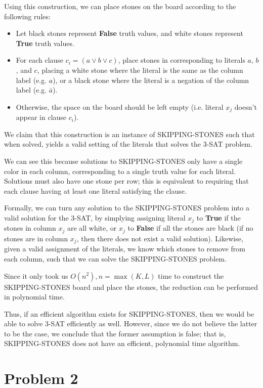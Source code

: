 \documentclass{6046}
\begin{document}
Using this construction, we can place stones
on the board according to the following rules:
\vspace{-1em}
\begin{itemize}[noitemsep]
    \item Let black stones represent {\bf False}
    truth values, and white stones represent
    {\bf True} truth values.
    \item For each clause $c_i = (a \vee b \vee c)$,
    place stones in corresponding to literals
    $a$, $b$, and $c$, placing a white stone
    where the literal is the same as the column
    label (e.g. $a$), or a black stone
    where the literal is a negation of the column
    label (e.g. $\bar{a}$).
    \item Otherwise, the space on the board should
    be left empty (i.e. literal $x_j$ doesn't appear
    in clause $c_i$).
\end{itemize}

We claim that this construction is an
instance of SKIPPING-STONES such that when
solved, yields a valid setting of the literals
that solves the 3-SAT problem.

We can see this because solutions to SKIPPING-STONES
only have a single color in each column, corresponding
to a single truth value for each literal. Solutions
must also have one stone per row; this is equivalent
to requiring that each clause having at least
one literal satisfying the clause.

Formally, we can turn any solution to the SKIPPING-STONES
problem into a valid solution for the 3-SAT,
by simplying assigning literal $x_j$ to {\bf True}
if the stones in column $x_j$ are all white, or $x_j$ to
{\bf False} if all the stones are black (if no stones
are in column $x_j$, then there does not exist a valid
solution). Likewise, given a valid assignment of the
literals, we know which stones to remove from
each column, such that we can solve the SKIPPING-STONES
problem.

Since it only took us $O(n^2), n = \max(K, L)$ time
to construct the SKIPPING-STONES board and place
the stones, the reduction can be performed in polynomial
time.

Thus, if an efficient algorithm exists for SKIPPING-STONES,
then we would be able to solve 3-SAT efficiently as well.
However, since we do not believe the latter to be the
case, we conclude that the former assumption is false;
that is, SKIPPING-STONES does not have an efficient,
polynomial time algorithm.

\section*{Problem 2}
\end{document}
